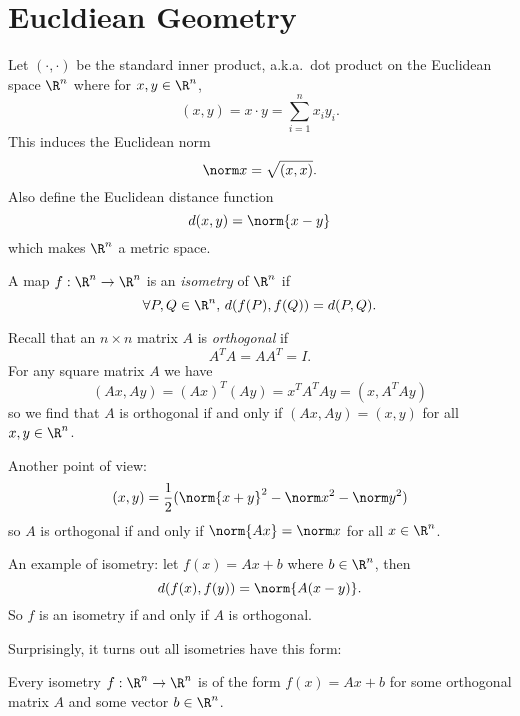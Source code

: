 \documentclass[a4paper]{article}
\begin{document}


\tableofcontents

\section{Eucldiean Geometry}

Let \((\cdot, \cdot)\) be the standard inner product, a.k.a.\ dot product on the Euclidean space \(\R^n\) where for \(x, y \in \R^n\),
\[
  (x, y) = x \cdot y = \sum_{i = 1}^{n}x_iy_i.
\]
This induces the Euclidean norm
\[
  \norm x = \sqrt{(x, x)}.
\]
Also define the Euclidean distance function
\[
  d(x, y) = \norm{x - y}
\]
which makes \(\R^n\) a metric space.

\begin{definition}[Isometry]
  A map \(f: \R^n \to \R^n\) is an \emph{isometry} of \(\R^n\) if
  \[
    \forall P, Q \in \R^n,\, d(f(P), f(Q)) = d(P, Q).
  \]
\end{definition}

Recall that an \(n \times n\) matrix \(A\) is \emph{orthogonal} if
\[
  A^TA = AA^T = I.
\]
For any square matrix \(A\) we have
\[
  (Ax, Ay) = (Ax)^T(Ay) = x^TA^TAy = (x, A^TAy)
\]
so we find that \(A\) is orthogonal if and only if \((Ax, Ay) = (x, y)\) for all \(x, y \in \R^n\).

Another point of view:
\[
  (x, y) = \frac{1}{2}(\norm{x + y}^2 -  \norm x^2 - \norm y^2)
\]
so \(A\) is orthogonal if and only if \(\norm{Ax} = \norm x\) for all \(x \in \R^n\).

An example of isometry: let \(f(x) = Ax + b\) where \(b \in \R^n\), then
\[
  d(f(x), f(y)) = \norm{A(x - y)}.
\]
So \(f\) is an isometry if and only if \(A\) is orthogonal.

Surprisingly, it turns out all isometries have this form:

\begin{theorem}
  Every isometry \(f: \R^n \to \R^n\) is of the form \(f(x) = Ax + b\) for some orthogonal matrix \(A\) and some vector \(b \in \R^n\).
\end{theorem}
\end{document}
